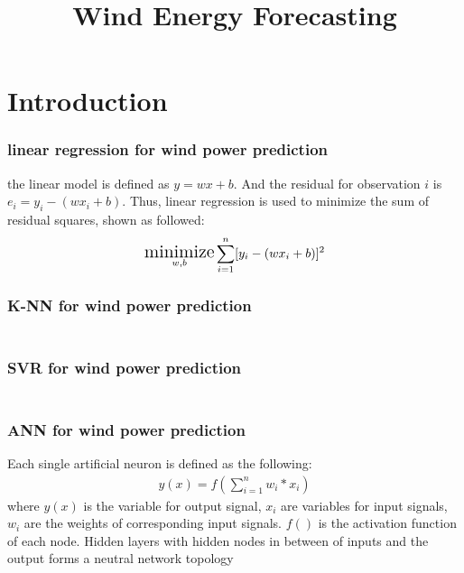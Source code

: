 \documentclass[a4paper, article, oneside, USenglish, IN5460]{memoir}
\title{ Wind Energy Forecasting }
\DeclareMathOperator*{\min}{\text{\Large minimize}}
\begin{document}
\shorthandoff{}

\projectfrontpage


\chapter{Introduction}
\subsection{linear regression for wind power prediction}
the linear model is defined as $y=wx+b$.
And the residual for observation $i$ is $e_i =y_i -(wx_i+b)$. Thus, linear regression is used to minimize the sum of residual squares, shown as followed:
\begin{equation}
\begin{aligned}
\min_{w,b}\sum_{i=1}^{n} [y_i-(wx_i+b)]^2
\end{aligned}
\end{equation}
\newline


\subsection{K-NN for wind power prediction}
\begin{equation}
\begin{aligned}

\end{aligned}
\end{equation}
\newline

\subsection{SVR for wind power prediction}
\begin{equation}
\begin{aligned}

\end{aligned}
\end{equation}
\newline


\subsection{ANN for wind power prediction}
Each single artificial neuron is defined as the following: 
\begin{equation}
\begin{aligned}
y(x) = f(\sum_{i=1}^{n} w_i*x_i)
\end{aligned}
\end{equation}
where $y(x)$ is the variable for output signal, $x_i$ are variables for input signals, $w_i$ are the weights of corresponding input signals. $f()$ is the activation function of each node. Hidden layers with hidden nodes in between of inputs and the output forms a neutral network topology
\newline
\end{document}
